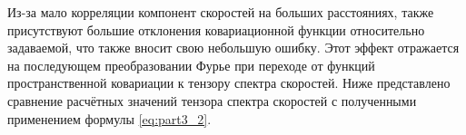 Из-за мало корреляции компонент скоростей на больших расстояниях, также присутствуют большие отклонения ковариационной функции относительно задаваемой, что также вносит свою небольшую ошибку. Этот эффект отражается на последующем преобразовании Фурье при переходе от функций пространственной ковариации к тензору спектра скоростей. Ниже представлено сравнение расчётных значений тензора спектра скоростей с полученными применением формулы \eqref{eq:part3_2}. 
\noindent
\begin{figure}[!ht]
\end{figure}
